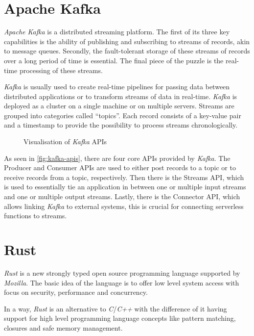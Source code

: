\section{Apache Kafka}
\label{sec:background-kafka}

\textit{Apache Kafka} is a distributed streaming platform. The first of its three key capabilities
is the ability of publishing and subscribing to streams of records, akin to message queues.
Secondly, the fault-tolerant storage of these streams of records over a long period of time is
essential. The final piece of the puzzle is the real-time processing of these streams.

\textit{Kafka} is usually used to create real-time pipelines for passing data between distributed
applications or to transform streams of data in real-time. \textit{Kafka} is deployed as a cluster
on a single machine or on multiple servers. Streams are grouped into categories called
“topics”. Each record consists of a key-value pair and a timestamp to provide the possibility to
process streams chronologically.

\begin{figure}[H]
  \centering
  \caption{Visualisation of \textit{Kafka} APIs \cite{kafka-complete-introduction}}
  \label{fig:kafka-apis}
\end{figure}

As seen in \autoref{fig:kafka-apis}, there are four core APIs provided by \textit{Kafka}. The
Producer and Consumer APIs are used to either post records to a topic or to receive records from a
topic, respectively. Then there is the Streams API, which is used to essentially tie an application
in between one or multiple input streams and one or multiple output streams. Lastly, there is the
Connector API, which allows linking \textit{Kafka} to external systems, this is crucial for
connecting serverless functions to streams.
\cite{kafka-introduction}

\section{Rust}

\textit{Rust} is a new strongly typed open source programming language supported by
\textit{Mozilla}. The basic idea of the language is to offer low level system access with focus on
security, performance and concurrency. \cite{rustbook1, forkjoin}

In a way, \textit{Rust} is an alternative to \textit{C}/\textit{C++} with the difference of it
having support for high level programming language concepts like pattern matching, closures and safe
memory management. \cite{rustbook1, forkjoin}

